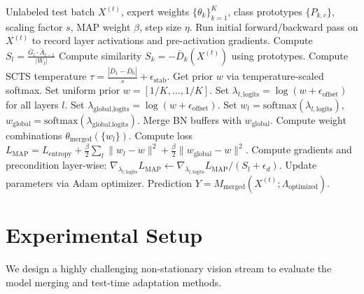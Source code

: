 \documentclass{article}
\theoremstyle{plain}
\theoremstyle{definition}
\theoremstyle{remark}
\begin{document}
\begin{algorithm}[tb]
\caption{KP-SCTS-Bayes Adaptation at step $t$}
\label{alg:kpscts}
\begin{algorithmic}[1]
 Unlabeled test batch $X^{(t)}$, expert weights $\{\theta_k\}_{k=1}^K$, class prototypes $\{P_{k,c}\}$, scaling factor $s$, MAP weight $\beta$, step size $\eta$.
 Run initial forward/backward pass on $X^{(t)}$ to record layer activations and pre-activation gradients.
\STATE Compute $S_l = \frac{\bar{G}_l \cdot \bar{A}_{l-1}}{|W_l|}$
\ENDFOR
{}
\STATE Compute similarity $S_k = -\bar{D}_k(X^{(t)})$ using prototypes.
\STATE Compute SCTS temperature $\tau = \frac{|\bar{D}_1 - \bar{D}_0|}{s} + \epsilon_{\text{stab}}$.
\STATE Get prior $w$ via temperature-scaled softmax.
\STATE Set uniform prior $w = [1/K, \dots, 1/K]$.
\ENDIF
{}
\STATE Set $\lambda_{l, \text{logits}} = \log(w + \epsilon_{\text{offset}})$ for all layers $l$.
\STATE Set $\lambda_{\text{global}, \text{logits}} = \log(w + \epsilon_{\text{offset}})$.
\STATE Set $w_l = \text{softmax}(\lambda_{l,\text{logits}})$, $w_{\text{global}} = \text{softmax}(\lambda_{\text{global},\text{logits}})$.
\STATE Merge BN buffers with $w_{\text{global}}$.
\STATE Compute weight combinations $\theta_{\text{merged}}(\{w_l\})$.
\STATE Compute loss $L_{\text{MAP}} = L_{\text{entropy}} + \frac{\beta}{2}\sum_l\|w_l-w\|^2 + \frac{\beta}{2}\|w_{\text{global}}-w\|^2$.
\STATE Compute gradients and precondition layer-wise:
\STATE $\nabla_{\lambda_{l,\text{logits}}} L_{\text{MAP}} \leftarrow \nabla_{\lambda_{l,\text{logits}}} L_{\text{MAP}} / (S_l + \epsilon_d)$.
\STATE Update parameters via Adam optimizer.
\ENDFOR
{} Prediction $Y = M_{\text{merged}}(X^{(t)}; \Lambda_{\text{optimized}})$.
\end{algorithmic}
\end{algorithm}

\section{Experimental Setup}
\label{submission-sec:experiments}
We design a highly challenging non-stationary vision stream to evaluate the model merging and test-time adaptation methods.
\end{document}
